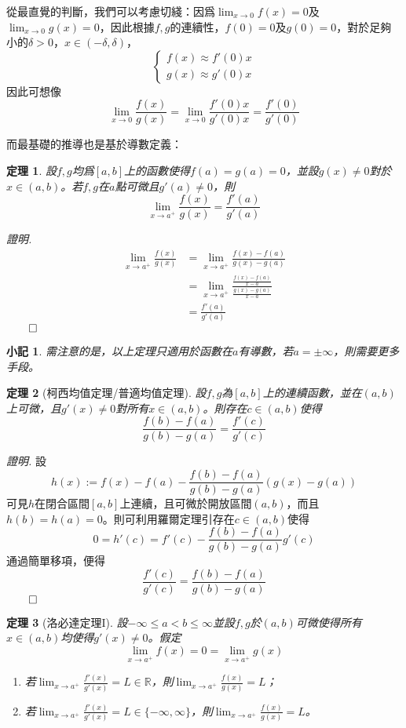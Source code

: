 \documentclass[12pt]{article}
\newtheorem*{theorem}{定理}
\newtheorem*{remark}{小記}
\renewenvironment*{proof}{\textit{證明.}}{\hfill$\qed$}
\begin{document}
    從最直覺的判斷，我們可以考慮切綫：因爲$\lim_{x\to 0}f(x)=0$及$\lim_{x\to 0}g(x)=0$，因此根據$f,g$的連續性，$f(0)=0$及$g(0)=0$，對於足夠小的$\delta>0$，$x\in(-\delta,\delta)$，$$\begin{cases}
        f(x)\approx f'(0)x\\ g(x)\approx g'(0)x
    \end{cases}$$因此可想像$$\lim_{x\to 0}\frac{f(x)}{g(x)}=\lim_{x\to 0}\frac{f'(0)x}{g'(0)x}=\frac{f'(0)}{g'(0)}$$

    而最基礎的推導也是基於導數定義：

    \begin{theorem}
        設$f,g$均爲$[a,b]$上的函數使得$f(a)=g(a)=0$，並設$g(x)\neq 0$對於$x\in(a,b)$。若$f,g$在$a$點可微且$g'(a)\neq 0$，則$$\lim_{x\to a^+}\frac{f(x)}{g(x)}=\frac{f'(a)}{g'(a)}$$
    \end{theorem}

    \begin{proof}
        \begin{align*}
            \lim_{x\to a^+}\frac{f(x)}{g(x)}&=\lim_{x\to a^+}\frac{f(x)-f(a)}{g(x)-g(a)}\\
            &=\lim_{x\to a^+}\frac{\frac{f(x)-f(a)}{x-a}}{\frac{g(x)-g(a)}{x-a}}\\
            &=\frac{f'(a)}{g'(a)}
        \end{align*}
    \end{proof}

    \begin{remark}
        需注意的是，以上定理只適用於函數在$a$有導數，若$a=\pm\infty$，則需要更多手段。
    \end{remark}

    \begin{theorem}[柯西均值定理/普適均值定理]
        設$f,g$為$[a,b]$上的連續函數，並在$(a,b)$上可微，且$g'(x)\neq 0$對所有$x\in(a,b)$。則存在$c\in(a,b)$使得$$\frac{f(b)-f(a)}{g(b)-g(a)}=\frac{f'(c)}{g'(c)}$$
    \end{theorem}

    \begin{proof}
        設$$h(x):=f(x)-f(a)-\frac{f(b)-f(a)}{g(b)-g(a)}(g(x)-g(a))$$可見$h$在閉合區間$[a,b]$上連續，且可微於開放區間$(a,b)$，而且$h(b)=h(a)=0$。則可利用羅爾定理引存在$c\in(a,b)$使得$$0=h'(c)=f'(c)-\frac{f(b)-f(a)}{g(b)-g(a)}g'(c)$$通過簡單移項，便得$$\frac{f'(c)}{g'(c)}=\frac{f(b)-f(a)}{g(b)-g(a)}$$
    \end{proof}

    \begin{theorem}[洛必達定理I]
        設$-\infty\leq a< b\leq \infty$並設$f,g$於$(a,b)$可微使得所有$x\in(a,b)$均使得$g'(x)\neq 0$。假定$$\lim_{x\to a^+}f(x)=0=\lim_{x\to a^+}g(x)$$\begin{enumerate}
            \item 若$\displaystyle\lim_{x\to a^+}\frac{f'(x)}{g'(x)}=L\in\mathbb{R}$，則$\displaystyle\lim_{x\to a^+}\frac{f(x)}{g(x)}=L$；
            \item 若$\displaystyle\lim_{x\to a^+}\frac{f'(x)}{g'(x)}=L\in\{-\infty,\infty\}$，則$\displaystyle\lim_{x\to a^+}\frac{f(x)}{g(x)}=L$。
        \end{enumerate}
    \end{theorem}
\end{document}
